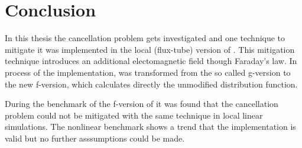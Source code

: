 
\NewPage
\chapter{Conclusion}
\label{chap:close}

\thispagestyle{empty}
\newpage

In this thesis the cancellation problem gets investigated and one technique to mitigate it was implemented in the local (flux-tube) version of {\gkw}. This mitigation technique introduces an additional electomagnetic field though Faraday's law. In process of the implementation, {\gkw} was transformed from the so called g-version to the new f-version, which calculates directly the unmodified distribution function. \bigskip

During the benchmark of the f-version of {\gkw} it was found that the cancellation problem could not be mitigated with the same technique in local linear simulations. The nonlinear benchmark shows a trend that the implementation is valid but no further asssumptions could be made. 